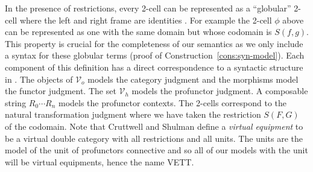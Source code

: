 \documentclass{llncs}
\begin{document}
In the presence of restrictions, every 2-cell can be represented as a
``globular'' 2-cell where the left and right frame are identities
\cite{Shulman08}. For example the 2-cell $\phi$ above can be
represented as one with the same domain but whose codomain is
$S(f,g)$. This property is crucial for the completeness of our
semantics as we only include a syntax for these globular terms (proof
of Construction~\ref{cons:syn-model}).
%
Each component of this definition has a direct correspondence to a
syntactic structure in \ohol{}. The objects of $\mathcal V_o$ models
the category judgment and the morphisms model the functor
judgment. The set $\mathcal V_h$ models the profunctor judgment. A
composable string $R_0 \cdots R_n$ models the profunctor contexts. The
2-cells correspond to the natural transformation judgment where we
have taken the restriction $S(F,G)$ of the codomain.
%
Note that Cruttwell and Shulman define a \emph{virtual equipment} to
be a virtual double category with all restrictions and all units. The
units are the model of the unit of profunctors connective and so all
of our models with the unit will be virtual equipments, hence the name
VETT.
\end{document}
